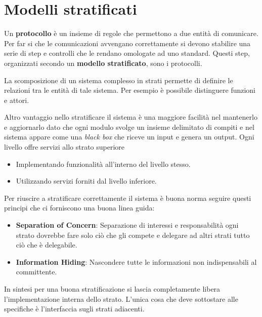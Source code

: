 \section{Modelli stratificati}
Un \textbf{protocollo} è un insieme di regole che permettono a due 
entità di comunicare. Per far si che le comunicazioni avvengano 
correttamente si devono stabilire una serie di step e controlli che 
le rendano omologate ad uno standard. Questi step, organizzati secondo
un \textbf{modello stratificato}, sono i protocolli.

La scomposizione di un sistema complesso in strati permette di definire
le relazioni tra le entità di tale sistema. Per esempio è possibile 
distinguere funzioni e attori.

Altro vantaggio nello stratificare il sistema è una maggiore facilità 
nel mantenerlo e aggiornarlo dato che ogni modulo svolge un insieme 
delimitato di compiti e nel sistema appare come una \emph{black box} 
che riceve un input e genera un output. Ogni livello offre servizi 
allo strato superiore
\begin{itemize}
	\item Implementando funzionalità all'interno del livello stesso.
	\item Utilizzando servizi forniti dal livello inferiore.
\end{itemize}
Per riuscire a stratificare correttamente il sistema è buona norma 
seguire questi principi che ci forniscono una buona linea guida:
\begin{itemize}
	\item \textbf{Separation of Concern}: Separazione di interessi e 
		responsabilità ogni strato dovrebbe fare solo ciò che gli 
		compete e delegare ad altri strati tutto ciò che è delegabile.
	\item \textbf{Information Hiding}: Nascondere tutte le informazioni
		non indispensabili al committente.
\end{itemize}
In sintesi per una buona stratificazione si lascia completamente libera
l'implementazione interna dello strato. L'unica cosa che deve
sottostare alle specifiche è l'interfaccia sugli strati adiacenti.

